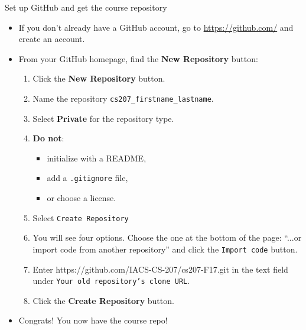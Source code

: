 \documentclass[onlymath, nologo]{beamer}
\begin{document}
  \begin{frame}{Set up GitHub and get the course repository}
    \begin{itemize}
      \item If you don't already have a GitHub account, go to \url{https://github.com/} and create an account. 
      \item From your GitHub homepage, find the \textcolor{green!75!black}{\textbf{New Repository}} button:
        \begin{enumerate}
          \item Click the \textcolor{green!75!black}{\textbf{New Repository}} button. 
          \item Name the repository \texttt{cs207\_firstname\_lastname}.
          \item Select \textbf{Private} for the repository type.
          \item \textbf{Do not}:
            \begin{itemize}
              \item initialize with a README, 
              \item add a \texttt{.gitignore} file, 
              \item or choose a license.
            \end{itemize}
          \item Select \texttt{Create Repository} 
          \item You will see four options.  Choose the one at the bottom of the page: 
                ``...or import code from another repository'' and click the \texttt{Import code} button.
          \item Enter https://github.com/IACS-CS-207/cs207-F17.git in the text field under 
                \texttt{Your old repository's clone URL}.
          \item Click the \textcolor{green!75!black}{\textbf{Create Repository}} button.
        \end{enumerate}
      \item Congrats!  You now have the course repo!
    \end{itemize}
  \end{frame}
\end{document}
